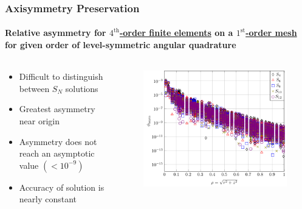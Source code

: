 \documentclass[compress,t]{beamer}
\begin{document}
\begin{frame}[t]
\frametitle{Axisymmetry Preservation}
\framesubtitle{Relative asymmetry for \underline{$4^\text{th}$-order finite elements} on a \underline{$1^\text{st}$-order mesh} for given order of level-symmetric angular quadrature}

\begin{columns}[T]

\begin{column}{0.4\textwidth}
\begin{itemize}
\item{Difficult to distinguish between $S_N$ solutions}
\item{Greatest asymmetry near origin}
\item{Asymmetry does not reach an asymptotic value $(<10^{-9})$}
\item{Accuracy of solution is nearly constant}
\end{itemize}

\end{column}

\begin{column}{0.6\textwidth}
\begin{figure}
\flushright
\includegraphics[scale=0.6]{./graphics/RZASMMSLinearRhoBrunnerp4g1r2.pdf}
\end{figure}

\end{column}

\end{columns}

\end{frame}
\end{document}
